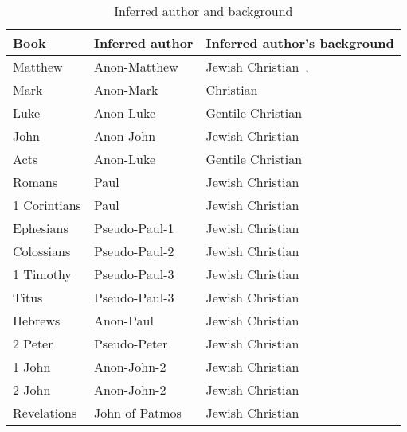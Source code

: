 \documentclass{article}
\begin{document}
\begin{table}
    \centering
    \renewcommand\arraystretch{1.3}
    \begin{tabular}{@{}lll@{}}
    \toprule
        Book & Inferred author & Inferred author's background\\
    \midrule
        Matthew & Anon-Matthew & Jewish Christian~\cite{Duling2010},~\cite{Saldarini2003} \\
        Mark & Anon-Mark & Christian~\cite{Schroter2010} \\
        Luke & Anon-Luke & Gentile Christian \\
        John & Anon-John & Jewish Christian \\
        Acts & Anon-Luke & Gentile Christian \\
        Romans & Paul & Jewish Christian \\
        1 Corintians & Paul & Jewish Christian \\
        Ephesians & Pseudo-Paul-1 & Jewish Christian \\
        Colossians & Pseudo-Paul-2~\cite{Hooker2003} & Jewish Christian \\
        1 Timothy & Pseudo-Paul-3 & Jewish Christian \\
        Titus & Pseudo-Paul-3 & Jewish Christian \\
        Hebrews & Anon-Paul~\cite{Thiselton2003} & Jewish Christian \\
        2 Peter & Pseudo-Peter~\cite{McKnight2003} & Jewish Christian \\
        1 John & Anon-John-2~\cite{Painter2003} & Jewish Christian \\
        2 John & Anon-John-2~\cite{Painter2003} & Jewish Christian \\
        Revelations & John of Patmos & Jewish Christian~\cite{Stuckenbruck2003} \\
    \bottomrule
    \end{tabular}
    \caption{Inferred author and background}
    \label{author}
\end{table}
\end{document}
